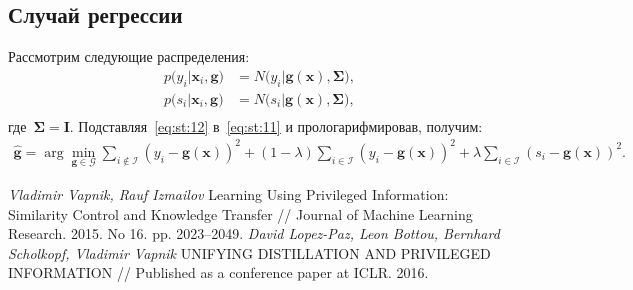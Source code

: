 \documentclass[12pt, twoside]{article}
\numberwithin{equation}{section}
\begin{document}
\subsection{Случай регрессии}
Рассмотрим следующие распределения:
\[
\label{eq:st:12}
\begin{aligned}
p\bigr(y_i|\textbf{x}_i, \textbf{g}\bigr) &= N\bigr(y_i|\textbf{g}(\textbf{x}), \bm{\Sigma}\bigr), \\
p\bigr(s_i|\textbf{x}_i, \textbf{g}\bigr) &= N\bigr(s_i|\textbf{g}(\textbf{x}),  \bm{\Sigma}\bigr), \\
\end{aligned}
\]
где~$\bm{\Sigma} = \textbf{I}$.
Подставляя~\eqref{eq:st:12} в~\eqref{eq:st:11} и прологарифмировав, получим:
\[
\label{eq:st:13}
\begin{aligned}
\hat{\textbf{g}} = \arg\min_{\textbf{g}\in \mathcal{G}}\sum_{i\not\in \mathcal{I}}\left(y_i-\textbf{g}(\textbf{x})\right)^{2}+\left(1-\lambda\right)\sum_{i\in \mathcal{I}}\left(y_i-\textbf{g}(\textbf{x})\right)^{2}+\lambda\sum_{i\in \mathcal{I}}\left(s_i-\textbf{g}(\textbf{x})\right)^{2}.
\end{aligned}
\]


\begin{thebibliography}{99}
	\textit{Vladimir Vapnik, Rauf Izmailov} Learning Using Privileged Information: Similarity Control and Knowledge Transfer // Journal of Machine Learning Research. 2015. No 16. pp. 2023--2049.
	\textit{David Lopez-Paz, Leon Bottou, Bernhard Scholkopf, Vladimir Vapnik} UNIFYING DISTILLATION
AND PRIVILEGED INFORMATION // Published as a conference paper at ICLR. 2016.
 \end{thebibliography}
\end{document}
